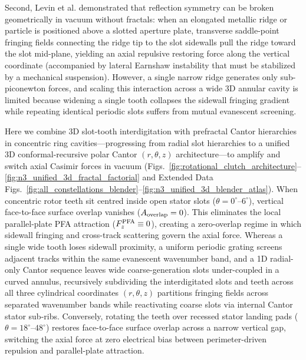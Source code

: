 \documentclass[pdflatex,sn-nature]{sn-jnl}
\begin{document}
Second, Levin et al.\cite{levin2010} demonstrated that reflection symmetry can be broken geometrically in vacuum without fractals: when an elongated metallic ridge or particle is positioned above a slotted aperture plate, transverse saddle-point fringing fields connecting the ridge tip to the slot sidewalls pull the ridge toward the slot mid-plane, yielding an axial repulsive restoring force along the vertical coordinate (accompanied by lateral Earnshaw instability that must be stabilized by a mechanical suspension)\cite{levin2010,rodriguez2011}. However, a single narrow ridge generates only sub-piconewton forces\cite{levin2010,rodriguez2011}, and scaling this interaction across a wide 3D annular cavity is limited because widening a single tooth collapses the sidewall fringing gradient while repeating identical periodic slots suffers from mutual evanescent screening.

Here we combine 3D slot-tooth interdigitation with prefractal Cantor hierarchies in concentric ring cavities---progressing from radial slot hierarchies to a unified 3D conformal-recursive polar Cantor $(r, \theta, z)$ architecture---to amplify and switch axial Casimir forces in vacuum (Figs.~\ref{fig:rotational_clutch_architecture}--\ref{fig:n3_unified_3d_fractal_factorial} and Extended Data Figs.~\ref{fig:all_constellations_blender}--\ref{fig:n3_unified_3d_blender_atlas}). When concentric rotor teeth sit centred inside open stator slots ($\theta = 0^\circ\text{--}6^\circ$), vertical face-to-face surface overlap vanishes ($A_{\rm overlap} = 0$). This eliminates the local parallel-plate PFA attraction ($F_z^{\rm PFA} \equiv 0$), creating a zero-overlap regime in which sidewall fringing and cross-track scattering govern the axial force. Whereas a single wide tooth loses sidewall proximity, a uniform periodic grating screens adjacent tracks within the same evanescent wavenumber band, and a 1D radial-only Cantor sequence leaves wide coarse-generation slots under-coupled in a curved annulus, recursively subdividing the interdigitated slots and teeth across all three cylindrical coordinates $(r, \theta, z)$ partitions fringing fields across separated wavenumber bands while reactivating coarse slots via internal Cantor stator sub-ribs. Conversely, rotating the teeth over recessed stator landing pads ($\theta = 18^\circ\text{--}48^\circ$) restores face-to-face surface overlap across a narrow vertical gap, switching the axial force at zero electrical bias between perimeter-driven repulsion and parallel-plate attraction.
\end{document}
